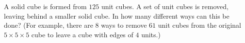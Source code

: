A solid cube is formed from $125$ unit cubes. A set of unit cubes is removed, leaving behind a smaller solid cube. In how many different ways can this be done? (For example, there are $8$ ways to remove $61$ unit cubes from the original $5\times5\times5$ cube to leave a cube with edges of $4$ units.)
